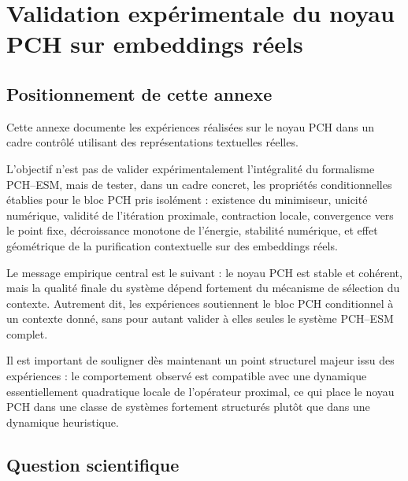 \documentclass[11pt,a4paper]{article}
\newcommand{\1}{\mathbf 1}
\begin{document}


\appendix

\section{Validation expérimentale du noyau PCH sur embeddings réels}

\subsection{Positionnement de cette annexe}

Cette annexe documente les expériences réalisées sur le noyau PCH dans un cadre contrôlé utilisant des représentations textuelles réelles.

L’objectif n’est pas de valider expérimentalement l’intégralité du formalisme PCH--ESM, mais de tester, dans un cadre concret, les propriétés conditionnelles établies pour le bloc PCH pris isolément : existence du minimiseur, unicité numérique, validité de l’itération proximale, contraction locale, convergence vers le point fixe, décroissance monotone de l’énergie, stabilité numérique, et effet géométrique de la purification contextuelle sur des embeddings réels.

Le message empirique central est le suivant : le noyau PCH est stable et cohérent, mais la qualité finale du système dépend fortement du mécanisme de sélection du contexte. Autrement dit, les expériences soutiennent le bloc PCH conditionnel à un contexte donné, sans pour autant valider à elles seules le système PCH--ESM complet.

Il est important de souligner dès maintenant un point structurel majeur issu des expériences : le comportement observé est compatible avec une dynamique essentiellement quadratique locale de l’opérateur proximal, ce qui place le noyau PCH dans une classe de systèmes fortement structurés plutôt que dans une dynamique heuristique.

\subsection{Question scientifique}
\end{document}
